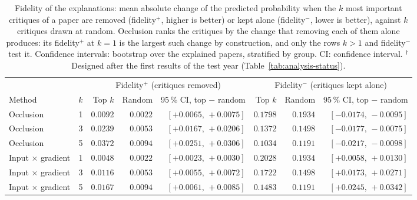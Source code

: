 \begin{table}[t]
\centering
\small
\setlength{\tabcolsep}{4pt}
\caption{Fidelity of the explanations: mean absolute change of the predicted probability when the $k$ most important critiques of a paper are removed (fidelity$^{+}$, higher is better) or kept alone (fidelity$^{-}$, lower is better), against $k$ critiques drawn at random. Occlusion ranks the critiques by the change that removing each of them alone produces: its fidelity$^{+}$ at $k = 1$ is the largest such change by construction, and only the rows $k > 1$ and fidelity$^{-}$ test it. Confidence intervals: bootstrap over the explained papers, stratified by group. CI: confidence interval. $^{\dagger}$Designed after the first results of the test year (Table~\ref{tab:analysis-status}).}
\label{tab:explain-fidelity}
\begin{tabular}{@{}lrrrrrrr@{}}
\toprule
 & & \multicolumn{3}{c}{Fidelity$^{+}$ (critiques removed)} & \multicolumn{3}{c}{Fidelity$^{-}$ (critiques kept alone)} \\
\cmidrule(lr){3-5} \cmidrule(lr){6-8}
Method & $k$ & Top $k$ & Random & 95\,\% CI, top $-$ random & Top $k$ & Random & 95\,\% CI, top $-$ random \\
\midrule
Occlusion & 1 & $0.0092$ & $0.0022$ & $[+0.0065,\,+0.0075]$ & $0.1798$ & $0.1934$ & $[-0.0174,\,-0.0095]$ \\
Occlusion & 3 & $0.0239$ & $0.0053$ & $[+0.0167,\,+0.0206]$ & $0.1372$ & $0.1498$ & $[-0.0177,\,-0.0075]$ \\
Occlusion & 5 & $0.0372$ & $0.0094$ & $[+0.0251,\,+0.0306]$ & $0.1034$ & $0.1191$ & $[-0.0217,\,-0.0098]$ \\
Input $\times$ gradient & 1 & $0.0048$ & $0.0022$ & $[+0.0023,\,+0.0030]$ & $0.2028$ & $0.1934$ & $[+0.0058,\,+0.0130]$ \\
Input $\times$ gradient & 3 & $0.0116$ & $0.0053$ & $[+0.0055,\,+0.0072]$ & $0.1722$ & $0.1498$ & $[+0.0173,\,+0.0271]$ \\
Input $\times$ gradient & 5 & $0.0167$ & $0.0094$ & $[+0.0061,\,+0.0085]$ & $0.1483$ & $0.1191$ & $[+0.0245,\,+0.0342]$ \\
\bottomrule
\end{tabular}
\end{table}
